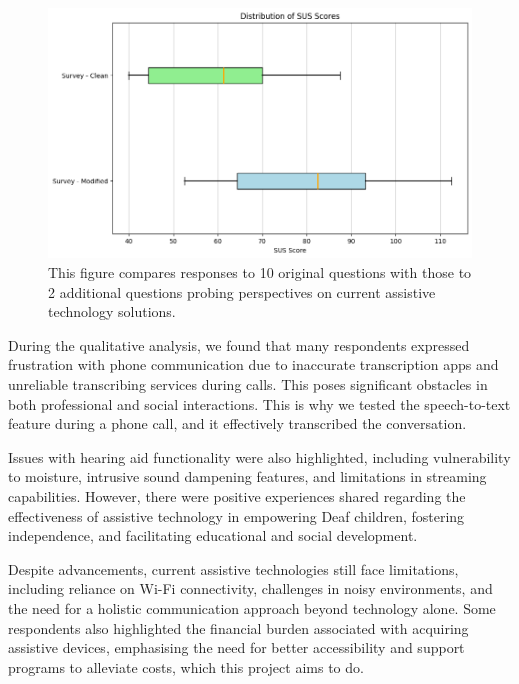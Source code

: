 \documentclass{l4proj}
\begin{document}
\begin{figure}
    \centering
    \includegraphics[width=0.9\linewidth]{dissertation/images/SUSSurvey.png}    
    \caption{This figure compares responses to 10 original questions with those to 2 additional questions probing perspectives on current assistive technology solutions.}
    \label{fig:survey-SUS} 
\end{figure}

During the qualitative analysis, we found that many respondents expressed frustration with phone communication due to inaccurate transcription apps and unreliable transcribing services during calls. This poses significant obstacles in both professional and social interactions. This is why we tested the speech-to-text feature during a phone call, and it effectively transcribed the conversation.

Issues with hearing aid functionality were also highlighted, including vulnerability to moisture, intrusive sound dampening features, and limitations in streaming capabilities. However, there were positive experiences shared regarding the effectiveness of assistive technology in empowering Deaf children, fostering independence, and facilitating educational and social development.

Despite advancements, current assistive technologies still face limitations, including reliance on Wi-Fi connectivity, challenges in noisy environments, and the need for a holistic communication approach beyond technology alone. Some respondents also highlighted the financial burden associated with acquiring assistive devices, emphasising the need for better accessibility and support programs to alleviate costs, which this project aims to do.
\end{document}
